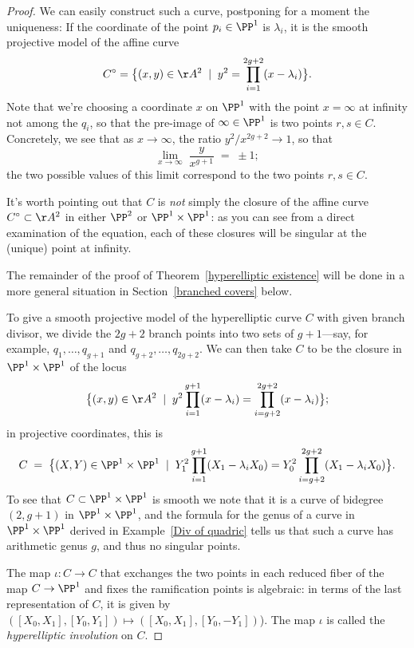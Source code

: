 \begin{proof} 
We can easily construct such a curve, postponing for a moment the uniqueness:
If the coordinate of the point $p_i \in \PP^1$ is $\lambda_i$, it is the smooth projective model of the affine curve 
  $$
C^\circ = \big\{ (x,y) \in \AA^2 \; \mid \; y^2 = \prod_{i=1}^{2g+2} (x - \lambda_i) \big\}.
$$ 
Note that we're choosing a coordinate $x$ on $\PP^1$ with the point $x = \infty$ at infinity not among the $q_i$, so that the pre-image of $\infty \in \PP^1$ is two points $r, s \in C$. Concretely, we see that as $x \to \infty$, the ratio $y^2/x^{2g+2} \to 1$, so that 
$$
\lim_{x \to \infty} \; \frac{y}{x^{g+1}} \; = \; \pm 1;
$$
  the two possible values of this limit correspond to the two points $r,s \in C$.
  
  It's worth pointing out that $C$ is \emph{not} simply the closure of the affine curve $C^\circ \subset \AA^2$ in either $\PP^2$ or $\PP^1 \times \PP^1$: as you can see from a direct examination of the equation, each of these closures will be singular at the (unique) point at infinity.
  
   The remainder of the proof of Theorem~\ref{hyperelliptic existence} will be done in a more general situation in Section~\ref{branched covers} below.
  
To give a smooth projective model of the hyperelliptic curve $C$ with given branch divisor, we divide the $2g+2$ branch points  into two sets of $g+1$---say, for example, $q_1,\dots,q_{g+1}$ and $q_{g+2}, \dots, q_{2g+2}$. We can then take $C$ to be the closure in $\PP^1 \times \PP^1$ of the  locus
  $$
  \big\{ (x,y) \in \AA^2 \; \mid \; y^2\prod_{i=1}^{g+1} (x - \lambda_i) = \prod_{i=g+2}^{2g+2} (x - \lambda_i) \big\};
  $$
  in projective coordinates, this is
   $$
  C \; = \; \big\{ (X,Y) \in \PP^1 \times \PP^1 \; \mid \; Y_1^2\prod_{i=1}^{g+1} (X_1 - \lambda_iX_0) = Y_0^2\prod_{i=g+2}^{2g+2} (X_1 - \lambda_iX_0) \big\}.
  $$
To see that $C \subset \PP^1 \times \PP^1$ is smooth we note that it is a curve of bidegree $(2,g+1)$ in $\PP^1 \times \PP^1$, and the formula for the genus of a curve in $\PP^1 \times \PP^1$ derived in Example~\ref{Div of quadric} tells us that such a curve has arithmetic genus $g$, and thus no singular points.
  
 The map $\iota : C \to C$ that exchanges the two points in each reduced fiber of the map $C \to \PP^1$ and fixes the ramification points is algebraic: in terms of the last representation of $C$, it is given by $([X_0,X_1], [Y_0,Y_1]) \mapsto  ([X_0,X_1], [Y_0,-Y_1]) $). The map $\iota$ is called the \emph{hyperelliptic involution} on $C$.


\end{proof}
